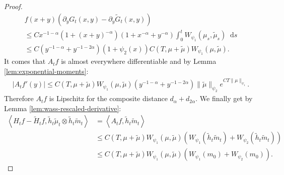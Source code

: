 \documentclass[11pt,a4paper]{article}
\newcommand{\brac}[1]{\left\langle#1\right\rangle}
\newcommand{\dd}{\mathop{}\!\mathrm{d}}
\begin{document}
\begin{proof}
\begin{multline*}
        f(x+y)\left( \partial_y G_t(x,y) - \partial_y \tilde{G}_t(x,y) \right) \\
        \leq C x^{-1-\alpha} (1 + (x+y)^{-\alpha})(1 + x^{-\alpha} + y^{-\alpha}) \int_0^t W_{\psi_1}(\mu_s,\tilde{\mu}_s) \dd s \\
        \leq C(y^{-1-\alpha} + y^{-1 - 2\alpha})(1 + \psi_2(x)) C(T,\mu + \tilde{\mu}) W_{\psi_1}(\mu,\tilde{\mu}) .
    \end{multline*}
    It comes that $A_tf$ is almost everywhere differentiable and by Lemma \ref{lem:exponential-moments}:
    \begin{align*}
        \left| A_tf'(y) \right| \leq C(T,\mu + \tilde{\mu}) W_{\psi_1}(\mu,\tilde{\mu}) (y^{-1-\alpha} + y^{-1 - 2\alpha}) \|\tilde{\mu}\|_{\psi_2}e^{CT\|\mu\|_{\psi_1}}.
    \end{align*}
    Therefore $A_tf$ is Lipschitz for the composite distance $d_\alpha + d_{2\alpha}$. We finally get by Lemma \ref{lem:wass-rescaled-derivative}:
    \begin{align*}
        \brac{H_tf - \tilde{H}_tf, \tilde{h}_t\tilde{\mu}_t\otimes \tilde{h}_t\tilde{m}_t} 
        &= \brac{A_tf,\tilde{h}_t\tilde{m}_t} \\
        &\leq C(T,\mu + \tilde{\mu}) W_{\psi_1}(\mu,\tilde{\mu}) \left(W_{\psi_1}(\tilde{h}_t\tilde{m}_t) + W_{\psi_2}(\tilde{h}_t\tilde{m}_t) \right)\\
        &\leq C(T,\mu + \tilde{\mu}) W_{\psi_1}(\mu,\tilde{\mu})\left(W_{\psi_1}(m_0) + W_{\psi_2}(m_0) \right).
    \end{align*}


\end{proof}
\end{document}
